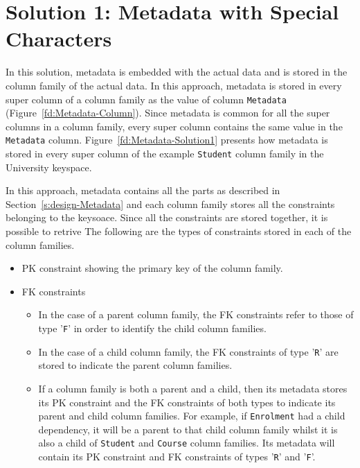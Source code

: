
\section{Solution 1:  Metadata with Special Characters} \label{s:design-sol1}

In this  solution,   metadata is embedded with the actual data and is
stored in the column family of the actual data.  In this approach,  metadata is
stored in every super column of a column family  as the value of column
\texttt{Metadata} (Figure~\ref{fd:Metadata-Column}).  Since metadata is
common for all the super columns in a column family,  every super column
contains the same  value in the \texttt{Metadata} column. 
Figure~\ref{fd:Metadata-Solution1} presents how metadata is stored in every
super column of the example \texttt{Student} column family in the University
keyspace. 
	
 
		
In this approach,  metadata contains all the parts as 
described in Section~\ref{s:design-Metadata} and each column family stores all
the constraints belonging to the keysoace. Since all the constraints are stored
together, it is possible to retrive 
The following are the types of constraints stored in
each of the column families. 
	
		\begin{itemize}
		  \item  \ac{PK} constraint showing the primary key of the column family. 
		  \item \ac{FK} constraints 
				\begin{itemize}
					\item In the case of a parent column family, the \ac{FK} constraints refer
					to those of type '\texttt{F}' in order to identify the child column
					families.
					\item  In the case of a child column family, the \ac{FK} constraints of
					type '\texttt{R}' are stored to indicate the parent column families. 
					\item If a column family is both a parent and a child,  then its metadata
					stores its \ac{PK} constraint and the \ac{FK} constraints of both types to
					indicate its parent and child column families. For example, if
					\texttt{Enrolment} had a child dependency, it will be a parent to
					that child column family whilst it is also a child of \texttt{Student} and
					\texttt{Course} column families. Its metadata will contain its \ac{PK}
					constraint and \ac{FK} constraints of types '\texttt{R}' and '\texttt{F}'.
				\end{itemize}
		\end{itemize}
		

